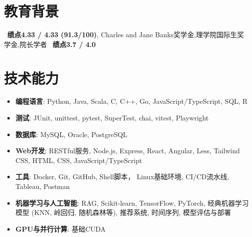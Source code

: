 \documentclass{resume}
\begin{document}




\section{教育背景}
\ \textbf{绩点4.33 / 4.33 (91.3/100)}, Charles and Jane Banks奖学金,理学院国际生奖学金,院长学者
\ \textbf{绩点3.7 / 4.0}

\section{技术能力}
\begin{itemize}[parsep=0.2ex]
  \item \textbf{编程语言}: Python, Java, Scala, C, C++, Go, JavaScript/TypeScript, SQL, R
  \item \textbf{测试}: JUnit, unittest, pytest, SuperTest, chai, vitest, Playwright
  \item \textbf{数据库}: MySQL, Oracle, PostgreSQL
  \item \textbf{Web开发}: RESTful服务, Node.js, Express, React, Angular, Less, Tailwind CSS, HTML, CSS, JavaScript/TypeScript
  \item \textbf{工具}: Docker, Git, GitHub, Shell脚本， Linux基础环境, CI/CD流水线, Tableau, Postman
  \item \textbf{机器学习与人工智能}: RAG, Scikit-learn, TensorFlow, PyTorch, 经典机器学习模型 (KNN, 岭回归, 随机森林等), 推荐系统, 时间序列, 模型评估与部署
  \item \textbf{GPU与并行计算}: 基础CUDA
\end{itemize}
\end{document}
